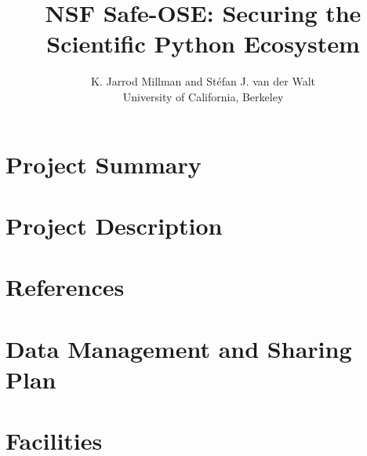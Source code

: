 \documentclass[titlepage,12pt]{amsart}
\title{NSF Safe-OSE: Securing the Scientific Python Ecosystem}
\author{ K. Jarrod Millman and Stéfan J. van der Walt\\ University of California, Berkeley}
\theoremstyle{definition}
\numberwithin{equation}{section}
\begin{document}
%
\maketitle
%
\part{Project Summary}


\newpage

\part{Project Description}


\newpage
\part{References}
\printbibliography[heading=none]

\newpage
\part{Data Management and Sharing Plan}


\newpage
\part{Facilities}

\end{document}
